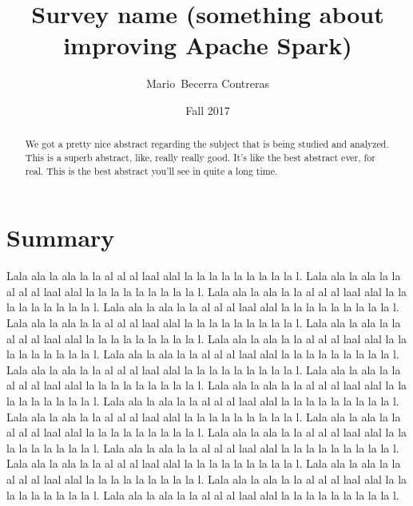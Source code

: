\documentclass{article}
\begin{document}

\title{Survey name (something about improving Apache Spark)}

\author{Mario~Becerra Contreras}

\date{Fall 2017}


\maketitle

\begin{abstract}

We got a pretty nice abstract regarding the subject that is being studied and analyzed. This is a superb abstract, like, really really good. It's like the best abstract ever, for real. This is the best abstract you'll see in quite a long time.

\end{abstract}

\section{Summary}

Lala ala la ala la la al al al laal alal la la la la la la la la la l. Lala ala la ala la la al al al laal alal la la la la la la la la la l. Lala ala la ala la la al al al laal alal la la la la la la la la la l. Lala ala la ala la la al al al laal alal la la la la la la la la la l. Lala ala la ala la la al al al laal alal la la la la la la la la la l. Lala ala la ala la la al al al laal alal la la la la la la la la la l. Lala ala la ala la la al al al laal alal la la la la la la la la la l. Lala ala la ala la la al al al laal alal la la la la la la la la la l. Lala ala la ala la la al al al laal alal la la la la la la la la la l. Lala ala la ala la la al al al laal alal la la la la la la la la la l. Lala ala la ala la la al al al laal alal la la la la la la la la la l. Lala ala la ala la la al al al laal alal la la la la la la la la la l. Lala ala la ala la la al al al laal alal la la la la la la la la la l. Lala ala la ala la la al al al laal alal la la la la la la la la la l. Lala ala la ala la la al al al laal alal la la la la la la la la la l. Lala ala la ala la la al al al laal alal la la la la la la la la la l. Lala ala la ala la la al al al laal alal la la la la la la la la la l. Lala ala la ala la la al al al laal alal la la la la la la la la la l. Lala ala la ala la la al al al laal alal la la la la la la la la la l. Lala ala la ala la la al al al laal alal la la la la la la la la la l. 
\end{document}
